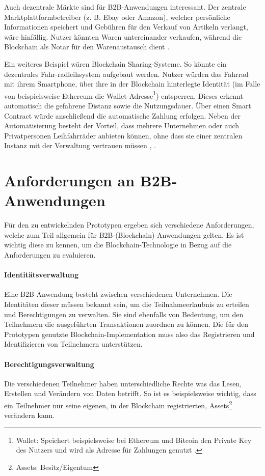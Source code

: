 Auch dezentrale Märkte sind für \acs{B2B}-Anwendungen interessant. Der zentrale Marktplattformbetreiber (z. B. Ebay oder Amazon), welcher persönliche Informationen speichert und Gebühren für den Verkauf von Artikeln verlangt, wäre hinfällig. Nutzer könnten Waren untereinander verkaufen, während die Blockchain als Notar für den Warenaustausch dient \cite{BenHamidaBlockchainEnterpriseOverview2017}.

Ein weiteres Beispiel wären Blockchain Sharing-Systeme. So könnte ein dezentrales Fahr-radleihsystem aufgebaut werden. Nutzer würden das Fahrrad mit ihrem Smartphone, über ihre in der Blockchain hinterlegte Identität (im Falle von beispielsweise Ethereum die Wallet-Adresse\footnote{Wallet: Speichert beispielsweise bei Ethereum und Bitcoin den Private Key des Nutzers und wird als Adresse für Zahlungen genutzt \cite[S.~61 ff.]{AntonopoulosMasteringbitcoin2015}.}) entsperren. Dieses erkennt automatisch die gefahrene Distanz sowie die Nutzungsdauer. Über einen Smart Contract würde anschließend die automatische Zahlung erfolgen. Neben der Automatisierung besteht der Vorteil, dass mehrere Unternehmen oder auch Privatpersonen Leihfahrräder anbieten können, ohne dass sie einer zentralen Instanz mit der Verwaltung vertrauen müssen \cite{FutureFluxFestivalBlockchainBikes}, \cite{FischerIoTBlockchain}.

\section{Anforderungen an B2B-Anwendungen}
\label{sec:general-requirements}
Für den zu entwickelnden Prototypen ergeben sich verschiedene Anforderungen, welche zum Teil allgemein für \acs{B2B}-(Blockchain)-Anwendungen gelten. Es ist wichtig diese zu kennen, um die Blockchain-Technologie in Bezug auf die Anforderungen zu evaluieren.

\paragraph{Identitätsverwaltung}
Eine \acs{B2B}-Anwendung besteht zwischen verschiedenen Unternehmen. Die Identitäten dieser müssen bekannt sein, um die Teilnahmeerlaubnis zu erteilen und Berechtigungen zu verwalten. Sie sind ebenfalls von Bedeutung, um den Teilnehmern die ausgeführten Transaktionen zuordnen zu können. Die für den Prototypen genutzte Blockchain-Implementation muss also das Registrieren und Identifizieren von Teilnehmern unterstützen.

\paragraph{Berechtigungsverwaltung}
Die verschiedenen Teilnehmer haben unterschiedliche Rechte was das Lesen, Erstellen und Verändern von Daten betrifft. So ist es beispielsweise wichtig, dass ein Teilnehmer nur seine eigenen, in der Blockchain registrierten, Assets\footnote{Assets: Besitz/Eigentum} verändern kann.

